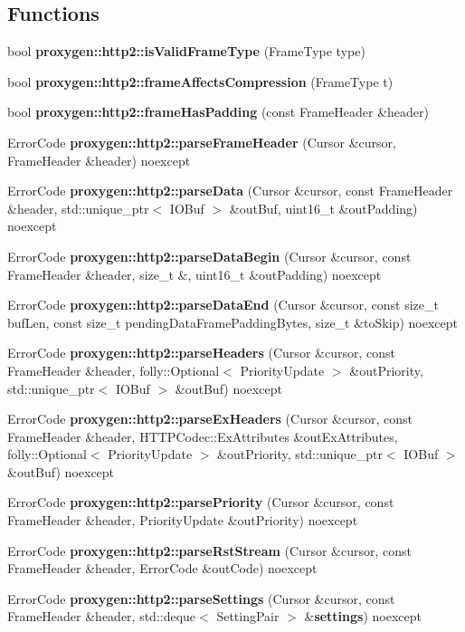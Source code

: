 \subsection*{Functions}
\begin{DoxyCompactItemize}
\item 
bool {\bf proxygen\+::http2\+::is\+Valid\+Frame\+Type} (Frame\+Type type)
\item 
bool {\bf proxygen\+::http2\+::frame\+Affects\+Compression} (Frame\+Type t)
\item 
bool {\bf proxygen\+::http2\+::frame\+Has\+Padding} (const Frame\+Header \&header)
\item 
Error\+Code {\bf proxygen\+::http2\+::parse\+Frame\+Header} (Cursor \&cursor, Frame\+Header \&header) noexcept
\item 
Error\+Code {\bf proxygen\+::http2\+::parse\+Data} (Cursor \&cursor, const Frame\+Header \&header, std\+::unique\+\_\+ptr$<$ I\+O\+Buf $>$ \&out\+Buf, uint16\+\_\+t \&out\+Padding) noexcept
\item 
Error\+Code {\bf proxygen\+::http2\+::parse\+Data\+Begin} (Cursor \&cursor, const Frame\+Header \&header, size\+\_\+t \&, uint16\+\_\+t \&out\+Padding) noexcept
\item 
Error\+Code {\bf proxygen\+::http2\+::parse\+Data\+End} (Cursor \&cursor, const size\+\_\+t buf\+Len, const size\+\_\+t pending\+Data\+Frame\+Padding\+Bytes, size\+\_\+t \&to\+Skip) noexcept
\item 
Error\+Code {\bf proxygen\+::http2\+::parse\+Headers} (Cursor \&cursor, const Frame\+Header \&header, folly\+::\+Optional$<$ Priority\+Update $>$ \&out\+Priority, std\+::unique\+\_\+ptr$<$ I\+O\+Buf $>$ \&out\+Buf) noexcept
\item 
Error\+Code {\bf proxygen\+::http2\+::parse\+Ex\+Headers} (Cursor \&cursor, const Frame\+Header \&header, H\+T\+T\+P\+Codec\+::\+Ex\+Attributes \&out\+Ex\+Attributes, folly\+::\+Optional$<$ Priority\+Update $>$ \&out\+Priority, std\+::unique\+\_\+ptr$<$ I\+O\+Buf $>$ \&out\+Buf) noexcept
\item 
Error\+Code {\bf proxygen\+::http2\+::parse\+Priority} (Cursor \&cursor, const Frame\+Header \&header, Priority\+Update \&out\+Priority) noexcept
\item 
Error\+Code {\bf proxygen\+::http2\+::parse\+Rst\+Stream} (Cursor \&cursor, const Frame\+Header \&header, Error\+Code \&out\+Code) noexcept
\item 
Error\+Code {\bf proxygen\+::http2\+::parse\+Settings} (Cursor \&cursor, const Frame\+Header \&header, std\+::deque$<$ Setting\+Pair $>$ \&{\bf settings}) noexcept

\end{DoxyCompactItemize}

